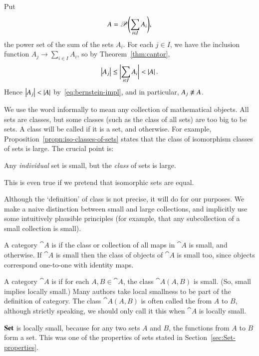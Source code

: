 \begin{pf}
Put
\[
A = \operatorname{\mathscr{P}}\Biggl(\sum_{i \in I} A_i\Biggr),
\]
the power set of the sum of the sets $A_i$.  For each $j \in I$, we have
the inclusion function $A_j \to \sum_{i \in I} A_i$, so by
Theorem~\ref{thm:cantor},
\[
\left|A_j\right| \leq \biggl| \sum_{i \in I} A_i \biggr| < \left|A\right|.
\]
Hence $\left|A_j\right| < \left|A\right|$ by~\eqref{eq:bernstein-impl}, and in particular,
$A_j \not\iso A$.
\end{pf}
%
%

We use the word %
%
%
informally to mean any collection of mathematical objects.  All sets are
classes, but some classes (such as the class of all sets) are too big to be
sets.  A class will be called %
%
%
if it is a set, and %
%
%
otherwise.  For example, Proposition~\ref{propn:iso-classes-of-sets} states
that the class of isomorphism classes of sets is large.  The crucial point
is:
%
\begin{slogan}
Any \emph{individual} set is small, but the \emph{class} of sets is
large.
\end{slogan}
%
This is even true if we pretend that isomorphic sets are equal.

Although the `definition' of class is not precise, it will do for our
purposes.  We make a naive distinction between small and large collections,
and implicitly use some intuitively plausible principles (for example, that
any subcollection of a small collection is small).

A category $\cat{A}$ is %
%
%
%
if the class or collection of all maps in $\cat{A}$ is small, and
%
%
%
%
otherwise.  If $\cat{A}$ is small then the class of objects of $\cat{A}$ is
small too, since objects correspond one-to-one with identity maps.

A category $\cat{A}$ is %
%
%
%
if for each $A, B \in \cat{A}$, the class $\cat{A}(A, B)$ is small.  (So,
small implies locally small.)  Many authors take local smallness to be part
of the definition of category.  The class $\cat{A}(A, B)$ is often called
the %
%
%
from $A$ to $B$, although strictly speaking, we should only call it this
when $\cat{A}$ is locally small.

\begin{example}
%
%
$\mathbf{Set}$ is locally small, because for any two sets $A$ and $B$, the
functions from $A$ to $B$ form a set.  This was one of the properties of
sets stated in Section~\ref{sec:Set-properties}.
\end{example}

